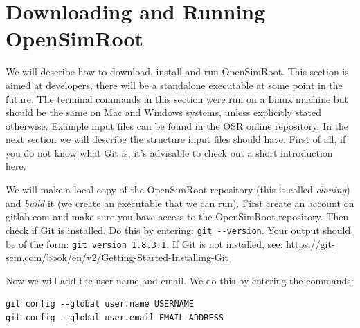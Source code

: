 \documentclass{article}
\begin{document}
\section{Downloading and Running OpenSimRoot}

We will describe how to download, install and run OpenSimRoot. This section is aimed at developers, there will be a standalone executable at some point in the future. The terminal commands in this section were run on a Linux machine but should be the same on Mac and Windows systems, unless explicitly stated otherwise. Example input files can be found in the \href{https://gitlab.com/rootmodels/OpenSimRoot}{OSR online repository}. In the next section we will describe the structure input files should have. First of all, if you do not know what Git is, it's advisable to check out a short introduction \href{https://speakerdeck.com/alicebartlett/git-for-humans}{here}. \newline

\noindent We will make a local copy of the OpenSimRoot repository (this is called \textit{cloning}) and \textit{build} it (we create an executable that we can run). First create an account on gitlab.com and make sure you have access to the OpenSimRoot repository. Then check if Git is installed. Do this by entering: \verb|git --version|. Your output should be of the form: \verb|git version 1.8.3.1|. If Git is not installed, see: \url{https://git-scm.com/book/en/v2/Getting-Started-Installing-Git} \newline

\noindent Now we will add the user name and email. We do this by entering the commands:
\begin{verbatim}
git config --global user.name USERNAME
git config --global user.email EMAIL ADDRESS
\end{verbatim}
\end{document}
